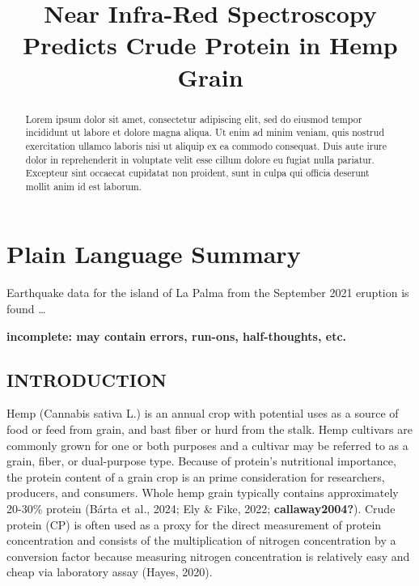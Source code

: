 \documentclass[
]{agujournal2019}
\begin{document}
\title{Near Infra-Red Spectroscopy Predicts Crude Protein in Hemp Grain}



\begin{abstract}
Lorem ipsum dolor sit amet, consectetur adipiscing elit, sed do eiusmod
tempor incididunt ut labore et dolore magna aliqua. Ut enim ad minim
veniam, quis nostrud exercitation ullamco laboris nisi ut aliquip ex ea
commodo consequat. Duis aute irure dolor in reprehenderit in voluptate
velit esse cillum dolore eu fugiat nulla pariatur. Excepteur sint
occaecat cupidatat non proident, sunt in culpa qui officia deserunt
mollit anim id est laborum.
\end{abstract}

\section*{Plain Language Summary}
Earthquake data for the island of La Palma from the September 2021
eruption is found \ldots{}



\textbf{incomplete: may contain errors, run-ons, half-thoughts, etc.}

\subsection{INTRODUCTION}\label{introduction}

Hemp (Cannabis sativa L.) is an annual crop with potential uses as a
source of food or feed from grain, and bast fiber or hurd from the
stalk. Hemp cultivars are commonly grown for one or both purposes and a
cultivar may be referred to as a grain, fiber, or dual-purpose type.
Because of protein's nutritional importance, the protein content of a
grain crop is an prime consideration for researchers, producers, and
consumers. Whole hemp grain typically contains approximately 20-30\%
protein (Bárta et al., 2024; Ely \& Fike, 2022; \textbf{callaway2004?}).
Crude protein (CP) is often used as a proxy for the direct measurement
of protein concentration and consists of the multiplication of nitrogen
concentration by a conversion factor because measuring nitrogen
concentration is relatively easy and cheap via laboratory assay (Hayes,
2020).
\end{document}
